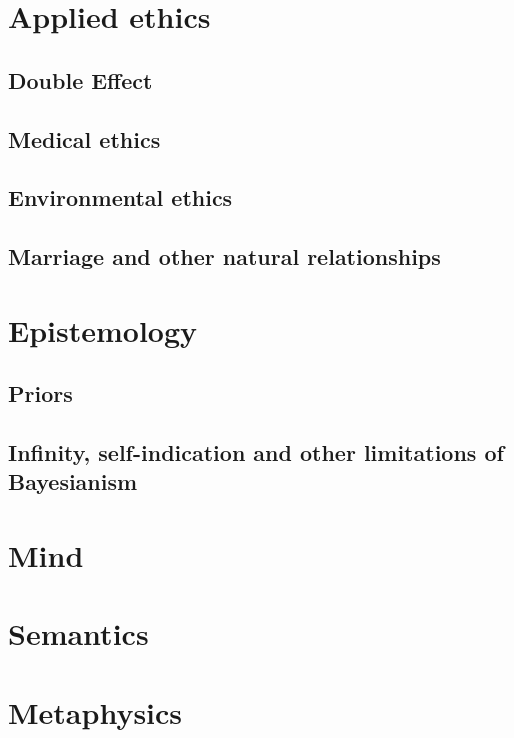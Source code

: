 
\def\mychapter{III}
\chapter{Applied ethics}\label{ch:applied-ethics}
\section{Double Effect}
\section{Medical ethics}
\section{Environmental ethics}
\section{Marriage and other natural relationships}
\chaptertail

\def\mychapter{IV}

\chapter{Epistemology}\label{ch:epistemology}
\section{Priors}
\section{Infinity, self-indication and other limitations of Bayesianism}
\chaptertail 

\def\mychapter{V}

\chapter{Mind}\label{ch:mind}
\chaptertail 

\def\mychapter{VI}

\chapter{Semantics}\label{ch:semantics}
\chaptertail

\def\mychapter{VII}

\chapter{Metaphysics}\label{ch:metaphysics}
\chaptertail 


